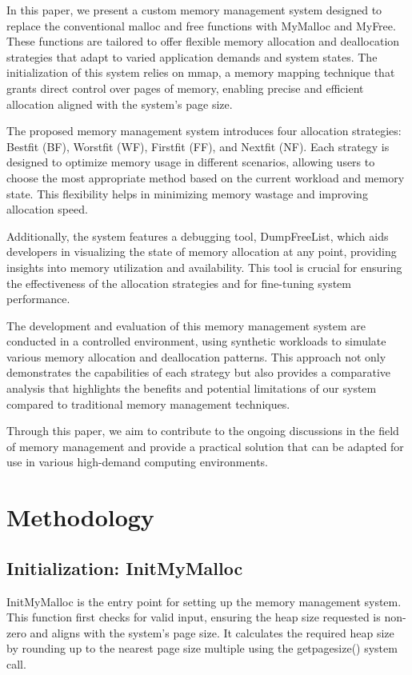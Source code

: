 \documentclass[conference]{IEEEtran}
\begin{document}
In this paper, we present a custom memory management system designed to replace the conventional malloc and free functions with MyMalloc and MyFree. These functions are tailored to offer flexible memory allocation and deallocation strategies that adapt to varied application demands and system states. The initialization of this system relies on mmap, a memory mapping technique that grants direct control over pages of memory, enabling precise and efficient allocation aligned with the system's page size.

The proposed memory management system introduces four allocation strategies: Bestfit (BF), Worstfit (WF), Firstfit (FF), and Nextfit (NF). Each strategy is designed to optimize memory usage in different scenarios, allowing users to choose the most appropriate method based on the current workload and memory state. This flexibility helps in minimizing memory wastage and improving allocation speed.

Additionally, the system features a debugging tool, DumpFreeList, which aids developers in visualizing the state of memory allocation at any point, providing insights into memory utilization and availability. This tool is crucial for ensuring the effectiveness of the allocation strategies and for fine-tuning system performance.

The development and evaluation of this memory management system are conducted in a controlled environment, using synthetic workloads to simulate various memory allocation and deallocation patterns. This approach not only demonstrates the capabilities of each strategy but also provides a comparative analysis that highlights the benefits and potential limitations of our system compared to traditional memory management techniques.

Through this paper, we aim to contribute to the ongoing discussions in the field of memory management and provide a practical solution that can be adapted for use in various high-demand computing environments.
\section{Methodology}
\subsection{Initialization: InitMyMalloc}
InitMyMalloc is the entry point for setting up the memory management system. This function first checks for valid input, ensuring the heap size requested is non-zero and aligns with the system’s page size. It calculates the required heap size by rounding up to the nearest page size multiple using the getpagesize() system call.
\end{document}
